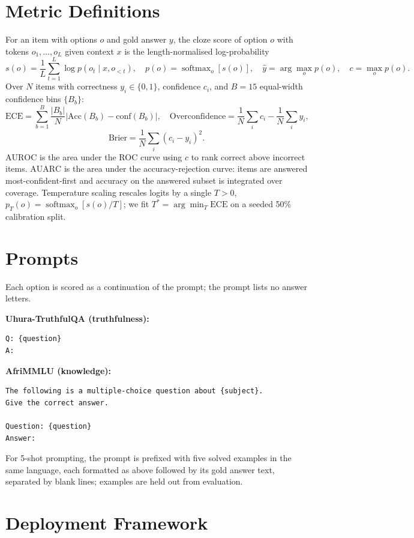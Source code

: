 \documentclass[11pt,a4paper]{article}
\newcommand{\ece}{\mathrm{ECE}}
\newcommand{\auarc}{\mathrm{AUARC}}
\newcommand{\auroc}{\mathrm{AUROC}}
\begin{document}
\section{Metric Definitions}
\label{app:metrics}

For an item with options $o$ and gold answer $y$, the cloze score of option $o$
with tokens $o_1,\ldots,o_L$ given context $x$ is the length-normalised
log-probability
\[
  s(o) = \frac{1}{L}\sum_{t=1}^{L}\log p(o_t \mid x, o_{<t}),\quad
  p(o) = \operatorname{softmax}_o[s(o)],\quad
  \hat{y} = \arg\max_o p(o),\quad
  c = \max_o p(o).
\]
Over $N$ items with correctness $y_i \in \{0,1\}$, confidence $c_i$, and
$B = 15$ equal-width confidence bins $\{B_b\}$:
\[
  \ece = \sum_{b=1}^{B} \frac{|B_b|}{N}\bigl|\mathrm{Acc}(B_b) - \mathrm{conf}(B_b)\bigr|,\quad
  \text{Overconfidence} = \frac{1}{N}\sum_i c_i - \frac{1}{N}\sum_i y_i,
\]
\[
  \text{Brier} = \frac{1}{N}\sum_i(c_i - y_i)^2.
\]
$\auroc$ is the area under the ROC curve using $c$ to rank correct above
incorrect items. $\auarc$ is the area under the accuracy-rejection curve:
items are answered most-confident-first and accuracy on the answered subset is
integrated over coverage. Temperature scaling rescales logits by a single
$T > 0$, $p_T(o) = \operatorname{softmax}_o[s(o)/T]$; we fit
$T^* = \arg\min_T \ece$ on a seeded 50\% calibration split.

\section{Prompts}
\label{app:prompts}

Each option is scored as a continuation of the prompt; the prompt lists no
answer letters.

\textbf{Uhura-TruthfulQA (truthfulness):}
\begin{verbatim}
Q: {question}
A:
\end{verbatim}

\textbf{AfriMMLU (knowledge):}
\begin{verbatim}
The following is a multiple-choice question about {subject}.
Give the correct answer.

Question: {question}
Answer:
\end{verbatim}

For 5-shot prompting, the prompt is prefixed with five solved examples in the
same language, each formatted as above followed by its gold answer text,
separated by blank lines; examples are held out from evaluation.

\section{Deployment Framework}
\label{app:deployment}
\end{document}
